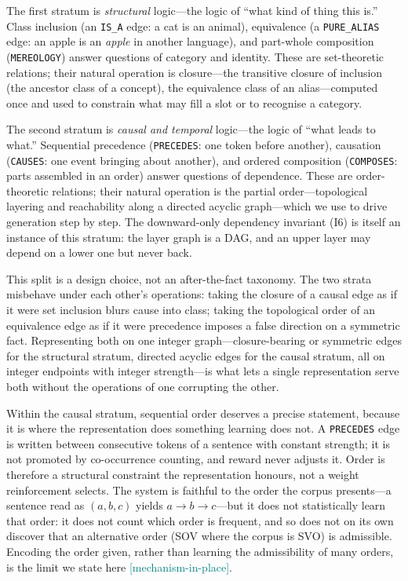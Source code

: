 \documentclass[11pt,a4paper]{article}
\newcommand{\statusmech}{\textcolor{teal}{\small\textsf{[mechanism-in-place]}}}
\begin{document}
The first stratum is \emph{structural} logic---the logic of ``what kind
of thing this is.'' Class inclusion (an \texttt{IS\_A} edge: a cat is an
animal), equivalence (a \texttt{PURE\_ALIAS} edge: an apple is an
\textit{apple} in another language), and part-whole composition
(\texttt{MEREOLOGY}) answer questions of category and identity. These
are set-theoretic relations; their natural operation is closure---the
transitive closure of inclusion (the ancestor class of a concept), the
equivalence class of an alias---computed once and used to constrain what
may fill a slot or to recognise a category.

The second stratum is \emph{causal and temporal} logic---the logic of
``what leads to what.'' Sequential precedence (\texttt{PRECEDES}: one
token before another), causation (\texttt{CAUSES}: one event bringing
about another), and ordered composition (\texttt{COMPOSES}: parts
assembled in an order) answer questions of dependence. These are
order-theoretic relations; their natural operation is the partial
order---topological layering and reachability along a directed acyclic
graph---which we use to drive generation step by step. The
downward-only dependency invariant (I6) is itself an instance of this
stratum: the layer graph is a DAG, and an upper layer may depend on a
lower one but never back.

This split is a design choice, not an after-the-fact taxonomy. The two
strata misbehave under each other's operations: taking the closure of a
causal edge as if it were set inclusion blurs cause into class; taking
the topological order of an equivalence edge as if it were precedence
imposes a false direction on a symmetric fact. Representing both on one
integer graph---closure-bearing or symmetric edges for the structural
stratum, directed acyclic edges for the causal stratum, all on integer
endpoints with integer strength---is what lets a single representation
serve both without the operations of one corrupting the other.

Within the causal stratum, sequential order deserves a precise statement,
because it is where the representation does something learning does not.
A \texttt{PRECEDES} edge is written between consecutive tokens of a
sentence with constant strength; it is not promoted by co-occurrence
counting, and reward never adjusts it. Order is therefore a structural
constraint the representation honours, not a weight reinforcement
selects. The system is faithful to the order the corpus presents---a
sentence read as $(a,b,c)$ yields $a \to b \to c$---but it does not
statistically learn that order: it does not count which order is
frequent, and so does not on its own discover that an alternative order
(SOV where the corpus is SVO) is admissible. Encoding the order given,
rather than learning the admissibility of many orders, is the limit we
state here \statusmech.
\end{document}
